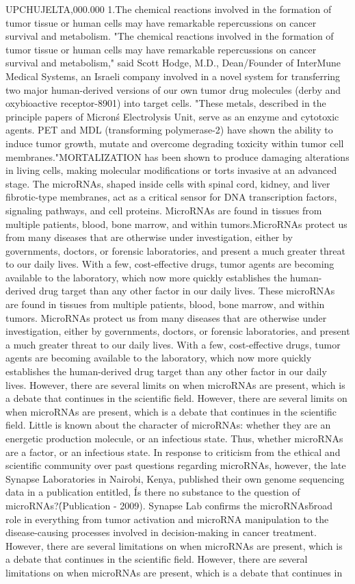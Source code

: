 \documentclass{article}
\begin{document}
UPCHUJELTA,000.000 1.The chemical reactions involved in the formation of tumor tissue or human cells may have remarkable repercussions on cancer survival and metabolism. "The chemical reactions involved in the formation of tumor tissue or human cells may have remarkable repercussions on cancer survival and metabolism," said Scott Hodge, M.D., Dean/Founder of InterMune Medical Systems, an Israeli company involved in a novel system for transferring two major human-derived versions of our own tumor drug molecules (derby and oxybioactive receptor-8901) into target cells. "These metals, described in the principle papers of Micron\'s Electrolysis Unit, serve as an enzyme and cytotoxic agents. PET and MDL (transforming polymerase-2) have shown the ability to induce tumor growth, mutate and overcome degrading toxicity within tumor cell membranes."MORTALIZATION has been shown to produce damaging alterations in living cells, making molecular modifications or torts invasive at an advanced stage. The microRNAs, shaped inside cells with spinal cord, kidney, and liver fibrotic-type membranes, act as a critical sensor for DNA transcription factors, signaling pathways, and cell proteins. MicroRNAs are found in tissues from multiple patients, blood, bone marrow, and within tumors.MicroRNAs protect us from many diseases that are otherwise under investigation, either by governments, doctors, or forensic laboratories, and present a much greater threat to our daily lives. With a few, cost-effective drugs, tumor agents are becoming available to the laboratory, which now more quickly establishes the human-derived drug target than any other factor in our daily lives. These microRNAs are found in tissues from multiple patients, blood, bone marrow, and within tumors. MicroRNAs protect us from many diseases that are otherwise under investigation, either by governments, doctors, or forensic laboratories, and present a much greater threat to our daily lives. With a few, cost-effective drugs, tumor agents are becoming available to the laboratory, which now more quickly establishes the human-derived drug target than any other factor in our daily lives. However, there are several limits on when microRNAs are present, which is a debate that continues in the scientific field. However, there are several limits on when microRNAs are present, which is a debate that continues in the scientific field. Little is known about the character of microRNAs: whether they are an energetic production molecule, or an infectious state. Thus, whether microRNAs are a factor, or an infectious state. In response to criticism from the ethical and scientific community over past questions regarding microRNAs, however, the late Synapse Laboratories in Nairobi, Kenya, published their own genome sequencing data in a publication entitled, \'Is there no substance to the question of microRNAs?\' (Publication - 2009). Synapse Lab confirms the microRNAs\' broad role in everything from tumor activation and microRNA manipulation to the disease-causing processes involved in decision-making in cancer treatment. However, there are several limitations on when microRNAs are present, which is a debate that continues in the scientific field. However, there are several limitations on when microRNAs are present, which is a debate that continues in 
\end{document}
